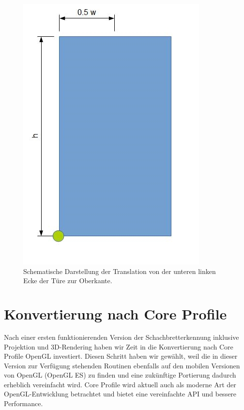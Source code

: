 \begin{figure}[!ht]
\centering
\includegraphics[scale=0.75]{images/opengl-translation.jpg} 
\caption{Schematische Darstellung der Translation von der unteren linken Ecke der Türe zur Oberkante.}
\label{fig:opencv-perspektive}
\end{figure}


\section{Konvertierung nach Core Profile}

Nach einer ersten funktionierenden Version der Schachbretterkennung inklusive Projektion und 3D-Rendering haben wir Zeit in die Konvertierung nach Core Profile OpenGL investiert. Diesen Schritt haben wir gewählt, weil die in dieser Version zur Verfügung stehenden Routinen ebenfalls auf den mobilen Versionen von OpenGL (OpenGL ES) zu finden und eine zukünftige Portierung dadurch erheblich vereinfacht wird. Core Profile wird aktuell auch als moderne Art der OpenGL-Entwicklung betrachtet und bietet eine vereinfachte API und bessere Performance.


